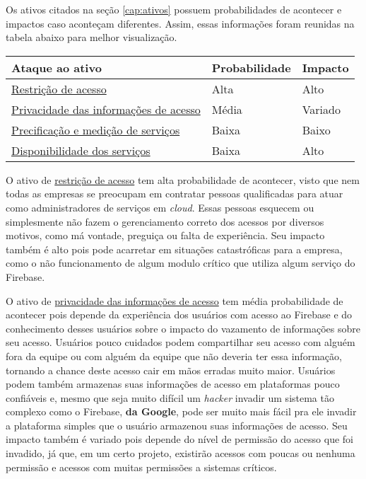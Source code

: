 \documentclass[
    openany,
    12pt,               %
    twoside,            %
    a4paper,            %
    english,            %
    brazil,             %
    ]{abntex2}
\begin{document}
Os ativos citados na seção \ref{cap:ativos} possuem  probabilidades de acontecer e impactos caso aconteçam diferentes. Assim, essas informações foram reunidas na tabela abaixo para melhor visualização.

\begin{table}[htbp]
\centering
\begin{tabular}{|l|l|l|}
\hline
\textbf{Ataque ao ativo} & \textbf{Probabilidade} & \textbf{Impacto}  \\ \hline
\hyperref[cap:restricao-acesso]{Restrição de acesso} &  Alta & Alto  \\ \hline
\hyperref[cap:privacidade-informacoes]{Privacidade das informações de acesso} & Média & Variado  \\ \hline
\hyperref[cap:precificacao-servicos]{Precificação e medição de serviços} &  Baixa & Baixo  \\ \hline
\hyperref[cap:disponibilidade-servicos]{Disponibilidade dos serviços} & Baixa & Alto \\ \hline
\end{tabular}
\end{table}

O ativo de \hyperref[cap:restricao-acesso]{restrição de acesso} tem alta probabilidade de acontecer, visto que nem todas as empresas se preocupam em contratar pessoas qualificadas para atuar como administradores de serviços em \textit{cloud}. Essas pessoas esquecem ou simplesmente não fazem o gerenciamento correto dos acessos por diversos motivos, como má vontade, preguiça ou falta de experiência. Seu impacto também é alto pois pode acarretar em situações catastróficas para a empresa, como o não funcionamento de algum modulo crítico que utiliza algum serviço do Firebase.

O ativo de \hyperref[cap:privacidade-informacoes]{privacidade das informações de acesso} tem média probabilidade de acontecer pois depende da experiência dos usuários com acesso ao Firebase e do conhecimento desses usuários sobre o impacto do vazamento de informações sobre seu acesso. Usuários pouco cuidados podem compartilhar seu acesso com alguém fora da equipe ou com alguém da equipe que não deveria ter essa informação, tornando a chance deste acesso cair em mãos erradas muito maior. Usuários podem também armazenas suas informações de acesso em plataformas pouco confiáveis e, mesmo que seja muito difícil um \textit{hacker} invadir um sistema tão complexo como o Firebase, \textbf{da Google}, pode ser muito mais fácil pra ele invadir a plataforma simples que o usuário armazenou suas informações de acesso. Seu impacto também é variado pois depende do nível de permissão do acesso que foi invadido, já que, em um certo projeto, existirão acessos com poucas ou nenhuma permissão e acessos com muitas permissões a sistemas críticos.
\end{document}
